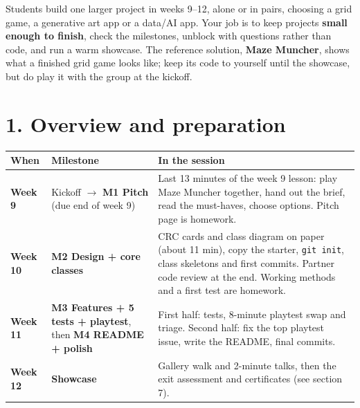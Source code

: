 \documentclass[level=3,teacher]{kidscode}
\begin{document}

\begin{tip}
Students build one larger project in weeks 9--12, alone or in pairs, choosing a grid game, a
generative art app or a data/AI app. Your job is to keep projects \textbf{small enough to finish},
check the milestones, unblock with questions rather than code, and run a warm showcase. The
reference solution, \textbf{Maze Muncher}, shows what a finished grid game looks like; keep its
code to yourself until the showcase, but do play it with the group at the kickoff.
\end{tip}

\setcounter{tocdepth}{1}
\tableofcontents

\section{1. Overview and preparation}

\renewcommand{\arraystretch}{1.3}
\begin{longtable}{@{}>{\bfseries}p{1.6cm}>{\raggedright\arraybackslash}p{4.2cm}p{\dimexpr\linewidth-5.8cm-4\tabcolsep}@{}}
\toprule
\rowcolor{kcaccent!15} When & Milestone & In the session\\ \midrule\endhead
\bottomrule\endfoot
Week 9 & Kickoff $\rightarrow$ \textbf{M1 Pitch} (due end of week 9) & Last 13 minutes of the
week 9 lesson: play Maze Muncher together, hand out the brief, read the must-haves, choose
options. Pitch page is homework.\\ \midrule
Week 10 & \textbf{M2 Design + core classes} & CRC cards and class diagram on paper (about 11 min),
copy the starter, \texttt{git init}, class skeletons and first commits. Partner code review at the
end. Working methods and a first test are homework.\\ \midrule
Week 11 & \textbf{M3 Features + 5 tests + playtest}, then \textbf{M4 README + polish} & First half:
tests, 8-minute playtest swap and triage. Second half: fix the top playtest issue, write the
README, final commits.\\ \midrule
Week 12 & \textbf{Showcase} & Gallery walk and 2-minute talks, then the exit assessment and
certificates (see section 7).\\
\end{longtable}
\end{document}
